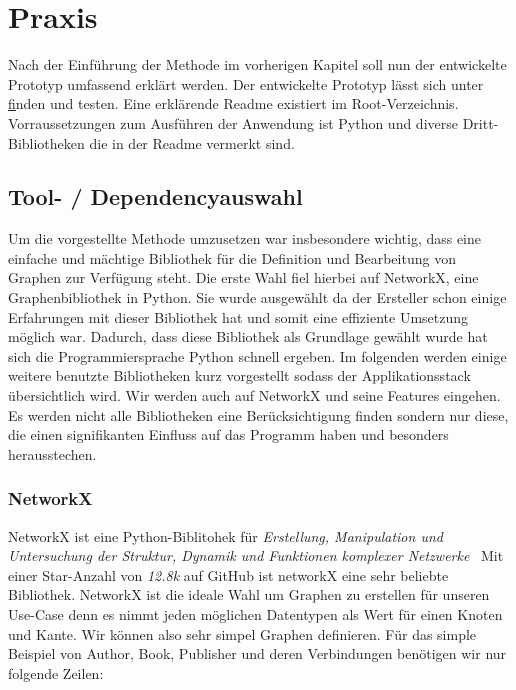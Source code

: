 \chapter{Praxis}

Nach der Einführung der Methode im vorherigen Kapitel soll nun der entwickelte Prototyp umfassend erklärt werden.
Der entwickelte Prototyp lässt sich unter \href{https://github.com/gernhard1337/graphql-primepath-tester} finden und testen.
Eine erklärende Readme existiert im Root-Verzeichnis.
Vorraussetzungen zum Ausführen der Anwendung ist Python und diverse Dritt-Bibliotheken die in der Readme vermerkt sind.

\section{Tool- / Dependencyauswahl}
Um die vorgestellte Methode umzusetzen war insbesondere wichtig, dass eine einfache und mächtige Bibliothek für die Definition und Bearbeitung
von Graphen zur Verfügung steht.
Die erste Wahl fiel hierbei auf NetworkX, eine Graphenbibliothek in Python.
Sie wurde ausgewählt da der Ersteller schon einige Erfahrungen mit dieser Bibliothek hat und somit eine effiziente Umsetzung möglich war.
Dadurch, dass diese Bibliothek als Grundlage gewählt wurde hat sich die Programmiersprache Python schnell ergeben.
Im folgenden werden einige weitere benutzte Bibliotheken kurz vorgestellt sodass der Applikationsstack übersichtlich wird.
Wir werden auch auf NetworkX und seine Features eingehen.
Es werden nicht alle Bibliotheken eine Berücksichtigung finden sondern nur diese, die einen signifikanten Einfluss auf das Programm haben und besonders herausstechen.

\subsection{NetworkX}

NetworkX ist eine Python-Biblitohek für \textit{Erstellung, Manipulation und Untersuchung der Struktur, Dynamik und Funktionen komplexer Netzwerke}~\cite[vgl. Startseite]{networkx}
Mit einer Star-Anzahl von \textit{12.8k}\cite{networkxgithub} auf GitHub ist networkX eine sehr beliebte Bibliothek.
NetworkX ist die ideale Wahl um Graphen zu erstellen für unseren Use-Case denn es nimmt jeden möglichen Datentypen als Wert für einen Knoten und Kante.
Wir können also sehr simpel Graphen definieren.
Für das simple Beispiel von Author, Book, Publisher und deren Verbindungen benötigen wir nur folgende Zeilen:

